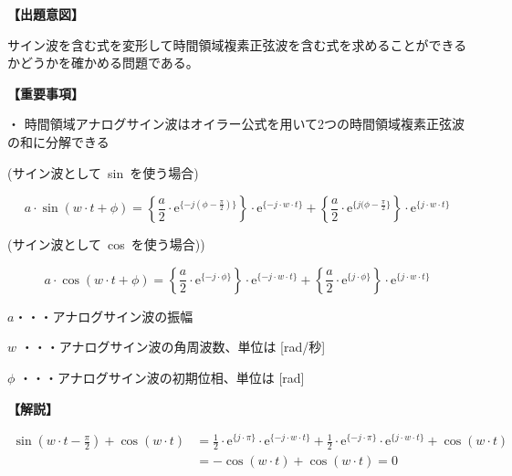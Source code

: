 \noindent \textbf{【出題意図】}

\bigskip
\noindent サイン波を含む式を変形して時間領域複素正弦波を含む式を求めることができるかどうかを確かめる問題である。

\vspace{1em}
\noindent \textbf{【重要事項】}

\medskip
\noindent ・ 時間領域アナログサイン波はオイラー公式を用いて2つの時間領域複素正弦波の和に分解できる

\medskip
\noindent \mbox{(サイン波として sin を使う場合)}

\[
a \cdot \sin ( w \cdot t + \phi )
=  \left \{ \frac{a}{2} \cdot \textrm{e}^{\{-j (\phi-\frac{\pi}{2}) \}} \right \} \cdot \textrm{e}^{\{-j \cdot w \cdot t \}}
+  \left \{ \frac{a}{2} \cdot \textrm{e}^{\{j (\phi-\frac{\pi}{2} \}} \right \} \cdot \textrm{e}^{\{j \cdot w \cdot t \}}
\]

\medskip
\noindent \mbox{(サイン波として cos を使う場合))}

\[
a \cdot \cos ( w \cdot t + \phi )
=  \left \{ \frac{a}{2} \cdot \textrm{e}^{\{-j \cdot \phi \}} \right \} \cdot \textrm{e}^{\{-j \cdot w \cdot t \}}
+  \left \{ \frac{a}{2} \cdot \textrm{e}^{\{j  \cdot \phi \}} \right \} \cdot \textrm{e}^{\{j \cdot w \cdot t \}}
\]

\bigskip
\noindent  $a$・・・アナログサイン波の振幅

\bigskip
\noindent $w$ ・・・アナログサイン波の角周波数、単位は [rad/秒]

\bigskip
\noindent $\phi$ ・・・アナログサイン波の初期位相、単位は [rad]

\bigskip

\vspace{1em}
\noindent \textbf{【解説】}

\bigskip

\begin{align*}
\sin \left ( w \cdot t - \frac{\pi}{2} \right ) + \cos ( w \cdot t )
&=
  \frac{1}{2} \cdot \textrm{e}^{ \{  j \cdot \pi \} } \cdot \textrm{e}^{ \{ -j \cdot w \cdot t \}} 
+ \frac{1}{2} \cdot \textrm{e}^{ \{ -j \cdot \pi \} } \cdot \textrm{e}^{ \{  j \cdot w \cdot t \}} 
+ \cos ( w \cdot t ) \\
&=
 -\cos ( w \cdot t )  + \cos ( w \cdot t )  = 0
\end{align*}
